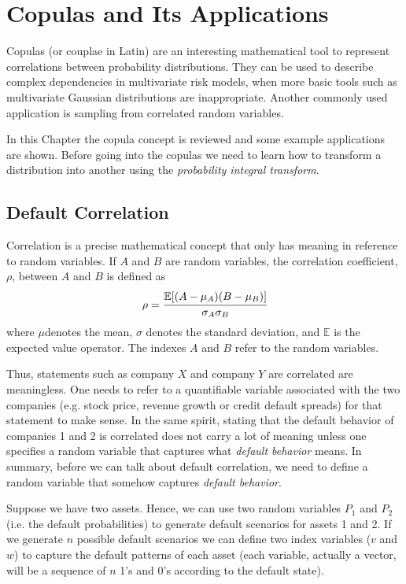 \chapter{Copulas and Its Applications}

Copulas (or couplae in Latin) are an interesting mathematical tool to represent correlations between probability distributions. They can be used to describe complex dependencies in multivariate risk models, when more basic tools such as multivariate Gaussian distributions are inappropriate. Another commonly used application is sampling from correlated random variables.

In this Chapter the copula concept is reviewed and some example applications are shown. 
Before going into the copulas we need to learn how to transform a distribution into another using the \emph{probability integral transform}. 

\section{Default Correlation}\label{sec:default_correlation}
Correlation is a precise mathematical concept that only has meaning 
in reference to random variables. If $A$ and $B$ are random variables, the correlation coefficient, $\rho$, between $A$ and $B$ is defined as
\begin{equation}
\rho = \cfrac{\mathbb{E}[(A-\mu_A)(B-\mu_B)]}{\sigma_A \sigma_B}
\label{eq:correlation_coefficient}
\end{equation}
where $\mu$denotes the mean, $\sigma$ denotes the standard deviation, and $\mathbb{E}$ is the expected value operator. The indexes $A$ and $B$ refer to the random variables.

Thus, statements such as company $X$ and company $Y$ are correlated are
meaningless. One needs to refer to a quantifiable variable associated with the two companies (e.g. stock price, revenue growth or credit default spreads) for that statement to make sense.
In the same spirit, stating that the default behavior of companies 1 and 2 is
correlated does not carry a lot of meaning unless one specifies a random
variable that captures what \emph{default behavior} means. In summary, before
we can talk about default correlation, we need to define a random variable
that somehow captures \emph{default behavior}.

Suppose we have two assets. Hence, we can use two random variables $P_1$ and $P_2$ (i.e. the default probabilities) to generate default scenarios for assets 1 and 2. If we generate $n$ possible default scenarios we can define two index variables ($v$ and $w$) to capture the default patterns of each asset (each variable, actually a vector, will be a sequence of $n$ 1’s and 0’s according to the default state).

